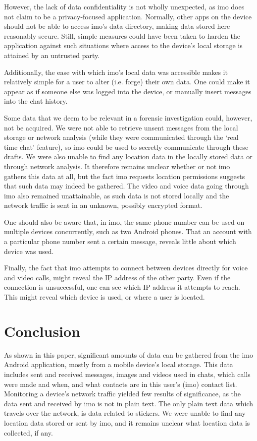 \documentclass[conference]{IEEEtran}
\begin{document}
However, the lack of data confidentiality is not wholly unexpected, as imo does
not claim to be a privacy-focused application. Normally, other apps on the
device should not be able to access imo's data directory, making data stored
here reasonably secure. Still, simple measures could have been taken to harden
the application against such situations where access to the device's local
storage is attained by an untrusted party.

Additionally, the ease with which imo's local data was accessible makes it
relatively simple for a user to alter (i.e. forge) their own data. One could
make it appear as if someone else was logged into the device, or manually
insert messages into the chat history.

Some data that we deem to be relevant in a forensic investigation could,
however, not be acquired. We were not able to retrieve unsent messages from the
local storage or network analysis (while they were communicated through the
`real time chat' feature), so imo could be used to secretly communicate through
these drafts. We were also unable to find any location data in the locally
stored data or through network analysis. It therefore remains unclear whether
or not imo gathers this data at all, but the fact imo requests location
permissions suggests that such data may indeed be gathered. The video and voice
data going through imo also remained unattainable, as such data is not stored
locally and the network traffic is sent in an unknown, possibly encrypted
format.

One should also be aware that, in imo, the same phone number can be used on
multiple devices concurrently, such as two Android phones. That an account with
a particular phone number sent a certain message, reveals little about which
device was used.

Finally, the fact that imo attempts to connect between devices directly for
voice and video calls, might reveal the IP address of the other party. Even if
the connection is unsuccessful, one can see which IP address it attempts to
reach. This might reveal which device is used, or where a user is located.


\section{Conclusion}\label{sec:conc}

As shown in this paper, significant amounts of data can be gathered from the
imo Android application, mostly from a mobile device's local storage. This data
includes sent and received messages, images and videos used in chats, which
calls were made and when, and what contacts are in this user's (imo) contact
list. Monitoring a device's network traffic yielded few results of
significance, as the data sent and received by imo is not in plain text. The
only plain text data which travels over the network, is data related to
stickers. We were unable to find any location data stored or sent by imo, and
it remains unclear what location data is collected, if any.
\end{document}
